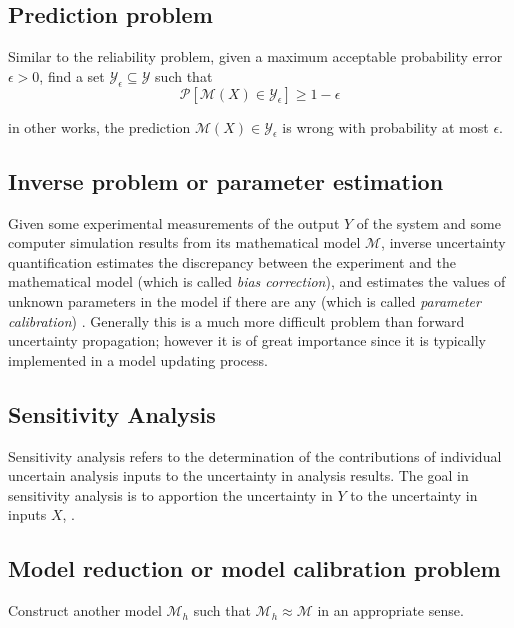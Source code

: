 \subsection{Prediction problem}\label{seq:prediction}
Similar to the reliability problem, given a maximum acceptable probability error $\epsilon > 0$, find a set $\mathcal{Y}_{\epsilon}\subseteq \mathcal{Y}$ such that
\begin{equation}
\mathcal{P}[\mathcal{M}(X)\in \mathcal{Y}_{\epsilon}]\geq 1-\epsilon
\end{equation}

in other works, the prediction $\mathcal{M}(X)\in \mathcal{Y}_{\epsilon}$ is wrong with probability at most $\epsilon$.

\subsection{Inverse problem or parameter estimation}\label{seq:inverse}
Given some experimental measurements of the output $Y$ of the system and some computer simulation results from its mathematical model $\mathcal{M}$, inverse uncertainty quantification estimates the discrepancy between the experiment and the mathematical model (which is called \textit{bias correction}), and estimates the values of unknown parameters in the model if there are any (which is called \textit{parameter calibration}) \cite{GharibShirangi2014}. Generally this is a much more difficult problem than forward uncertainty propagation; however it is of great importance since it is typically implemented in a model updating process.

\subsection{Sensitivity Analysis}\label{seq:sensitivity}
Sensitivity analysis refers to the determination of the contributions of individual uncertain analysis inputs to the uncertainty in analysis results. The goal in sensitivity analysis is to apportion the uncertainty in $Y$ to the uncertainty in inputs $X$, \cite{Sankararaman2012}. 

\subsection{Model reduction or model calibration problem}\label{seq:calibration}
Construct another model $\mathcal{M}_{h}$ such that $\mathcal{M}_{h} \approx \mathcal{M}$ in an appropriate sense. 

